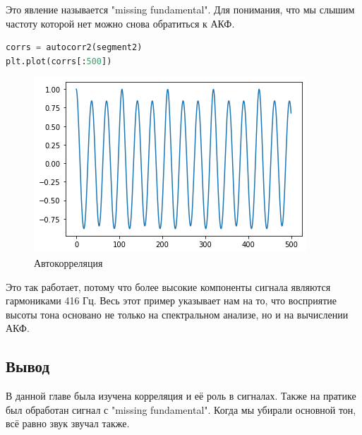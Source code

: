 Это явление называется "missing fundamental". Для понимания, что мы слышим частоту которой нет можно снова обратиться к АКФ.

\begin{lstlisting}[language=Python]
corrs = autocorr2(segment2)
plt.plot(corrs[:500])
\end{lstlisting}
\begin{figure}[H]
	\begin{center}
		\includegraphics[scale=1]{fig/lab05/lab05_54_1.png}
		\caption{Автокорреляция}
	\end{center}
\end{figure}


Это так работает, потому что более высокие компоненты сигнала являются гармониками 416 Гц. Весь этот пример указывает нам на то, что восприятие высоты тона основано не только на спектральном анализе, но и на вычислении АКФ.

\subsection{Вывод}

В данной главе была изучена корреляция и её роль в сигналах. Также на пратике был обработан сигнал с "missing fundamental". Когда мы убирали основной тон, всё равно звук звучал также.

